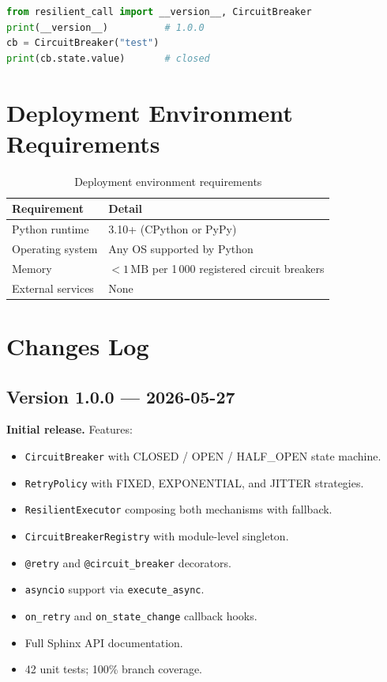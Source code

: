 \begin{lstlisting}[language=Python, caption={Smoke test after installation}, label={lst:smoke-test}]
from resilient_call import __version__, CircuitBreaker
print(__version__)          # 1.0.0
cb = CircuitBreaker("test")
print(cb.state.value)       # closed
\end{lstlisting}

\section{Deployment Environment Requirements}
\label{sec:deployment-requirements}

\begin{table}[H]
    \centering
    \caption{Deployment environment requirements}
    \begin{tabular}{ll}
        \toprule
        Requirement & Detail \\
        \midrule
        Python runtime    & 3.10+ (CPython or PyPy) \\
        Operating system  & Any OS supported by Python \\
        Memory            & $< 1\,\text{MB}$ per 1\,000 registered circuit breakers \\
        External services & None \\
        \bottomrule
    \end{tabular}
\end{table}

\section{Changes Log}
\label{sec:changelog}

\subsection*{Version 1.0.0 — 2026-05-27}

\textbf{Initial release.} Features:

\begin{itemize}[leftmargin=*, label=\textbullet]
    \item \texttt{CircuitBreaker} with CLOSED / OPEN / HALF\_OPEN state machine.
    \item \texttt{RetryPolicy} with FIXED, EXPONENTIAL, and JITTER strategies.
    \item \texttt{ResilientExecutor} composing both mechanisms with fallback.
    \item \texttt{CircuitBreakerRegistry} with module-level singleton.
    \item \texttt{@retry} and \texttt{@circuit\_breaker} decorators.
    \item \texttt{asyncio} support via \texttt{execute\_async}.
    \item \texttt{on\_retry} and \texttt{on\_state\_change} callback hooks.
    \item Full Sphinx API documentation.
    \item 42 unit tests; 100\% branch coverage.
\end{itemize}

